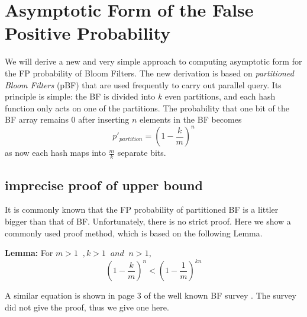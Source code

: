 \section{Asymptotic Form of the False Positive Probability}
\label{sec:limitf}
We will derive a new and very simple approach to computing asymptotic form for the FP probability of Bloom Filters. The new derivation is based on \textit{partitioned Bloom Filters} (pBF) that are used frequently to carry out parallel query. Its principle is simple: the BF is divided into $k$ even partitions, and each hash function only acts on one of the partitions. %
The probability that one bit of the BF array remains 0 after inserting $n$ elements in the BF becomes
\begin{equation}
p'_{partition} = \left( 1-\dfrac{k}{m} \right)^n
\end{equation}
as now each hash maps into $\frac{m}{k}$ separate bits.

\subsection{imprecise proof of upper bound}
It is commonly known that the FP probability of partitioned BF is a littler bigger than that of BF. Unfortunately, there is no strict proof. Here we show a commonly used proof method, which is based on the following Lemma. 

\textbf{Lemma:} For $m > 1 \;\;,   k >1 \;\; and \;\; n > 1$,
\begin{equation}
\label{theorem1}
\left( 1-\dfrac{k}{m} \right)  ^n <
\left( 1-\dfrac{1}{m} \right)  ^{kn}
\end{equation}

A similar equation is shown in page 3 of the well known BF survey \cite{BFSurvey}. The survey did not give the proof, thus we give one here.

